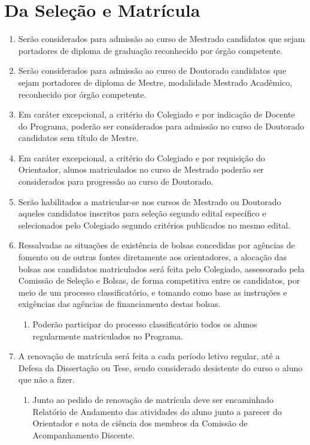 \documentclass{article}
\newcommand{\singleitem}{\item[Parágrafo Único.]}
\newcommand{\grupoMenor}{Colegiado\xspace}
\begin{document}
\section{Da Seleção e Matrícula}
\begin{enumerate}
	\item Serão considerados para admissão ao curso de Mestrado candidatos que sejam portadores de diploma de graduação reconhecido por órgão competente.

	\item Serão considerados para admissão ao curso de Doutorado candidatos que sejam portadores de diploma de Mestre, modalidade Mestrado Acadêmico, reconhecido por órgão competente.

	\item Em caráter excepcional, a critério do \grupoMenor e por indicação de Docente do Programa, poderão ser considerados para admissão no curso de Doutorado candidatos sem título de Mestre.

	\item Em caráter excepcional, a critério do \grupoMenor e por requisição do Orientador, alunos matriculados no curso de Mestrado poderão ser considerados para progressão ao curso de Doutorado.

	\item Serão habilitados a matricular-se nos cursos de Mestrado ou Doutorado aqueles candidatos inscritos para seleção segundo edital específico e selecionados pelo \grupoMenor segundo critérios publicados no mesmo edital.

	\item Ressalvadas as situações de existência de bolsas concedidas por agências de fomento ou de outras fontes diretamente aos orientadores, a alocação das bolsas aos candidatos matriculados será feita pelo \grupoMenor, assessorado pela Comissão de Seleção e Bolsas, de forma competitiva entre os candidatos, por meio de um processo classificatório, e tomando como base as instruções e exigências das agências de financiamento destas bolsas.
	\begin{enumerate}
		\item Poderão participar do processo classificatório todos os alunos regularmente matriculados no Programa.
	\end{enumerate}
	
	\item A renovação de matrícula será feita a cada período letivo regular, até a Defesa da Dissertação ou Tese, sendo considerado desistente do curso o aluno que não a fizer.
	\begin{enumerate}
		\singleitem Junto ao pedido de renovação de matrícula deve ser encaminhado Relatório de Andamento das atividades do aluno junto a parecer do Orientador e nota de ciência dos membros da Comissão de Acompanhamento Discente.
	\end{enumerate}


\end{enumerate}
\end{document}
